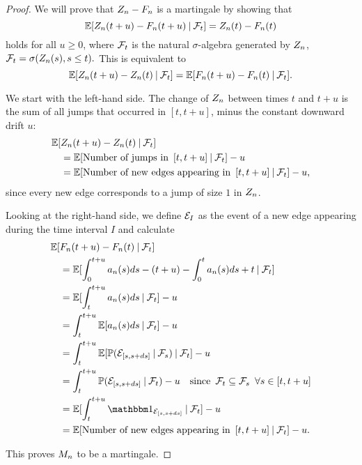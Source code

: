 \begin{proof} \label{P: decomp Zn}
	We will prove that $Z_n - F_n$ is a martingale by showing that
	\begin{equation} \label{E: Mn martingale}
	\mathbb{E}[ Z_n(t+u) - F_n(t+u) \: | \: \mathcal{F}_{t} ] = Z_n(t) - F_n(t)
	\end{equation}
	holds for all $u \geq 0$, where $\mathcal{F}_{t}$ is the natural $\sigma$-algebra generated by $Z_n$, 
	$\mathcal{F}_{t} = \sigma(Z_n(s), s \leq t).$
	This is equivalent to 
	\begin{equation}
	\mathbb{E}[Z_n(t+u) - Z_n(t) \: | \: \mathcal{F}_{t}] = \mathbb{E}[F_n(t+u) - F_n(t) \: | \: \mathcal{F}_{t}].
	\end{equation}
	
	We start with the left-hand side. 
	The change of $Z_n$ between times $t$ and $t+u$ is the sum of all jumps that occurred in $[t, t+u]$,
	minus the constant downward drift $u$:
	\begin{align*}
	\mathbb{E}[&Z_n(t+u) - Z_n(t) \: | \: \mathcal{F}_{t}] \\
	&= \mathbb{E}[\text{Number of jumps in} \enspace [t, t+u] \: | \: \mathcal{F}_{t}] - u \\
	&= \mathbb{E}[\text{Number of new edges appearing in} \enspace [t, t+u] \: | \: \mathcal{F}_{t}] - u,
	\end{align*}
	since every new edge corresponds to a jump of size $1$ in $Z_n$.
	
	Looking at the right-hand side, we define $\mathcal{E}_{I}$ as the event of a new edge appearing during the time interval $I$ and calculate
	\begin{align*}
	\Exp{&\An(t+u) - \An(t) \cond \F{t}} \\
	&= \Exp{ \int_{0}^{t+u} a_n(s)ds - (t+u) - \int_{0}^{t} a_n(s)ds + t \cond \F{t} } \\
	&= \Exp{ \int_{t}^{t+u} a_n(s)ds \cond \F{t} } - u \\
	&= \int_{t}^{t+u} \Exp{a_n(s)ds \cond \F{t}} - u \\
	&= \int_{t}^{t+u} \Exp{ \Prob(\NewEdge{\sds} \cond \F{s}) \cond \F{t} } - u\\
	&= \int_{t}^{t+u} \Prob( \NewEdge{\sds} \cond \F{t} ) - u
	\quad \text{since} \enspace \F{t} \subseteq \F{s} \enspace \forall s \in [t,t+u] \\
	&= \Exp{ \int_{t}^{t+u}  \Ind{\NewEdge{\sds}} \cond \F{t}} -u \\
	&= \Exp{\text{Number of new edges appearing in} \enspace [t, t+u] \cond \F{t}} - u.
	\end{align*}
	
	
	This proves $M_n$ to be a martingale. 	
\end{proof}

